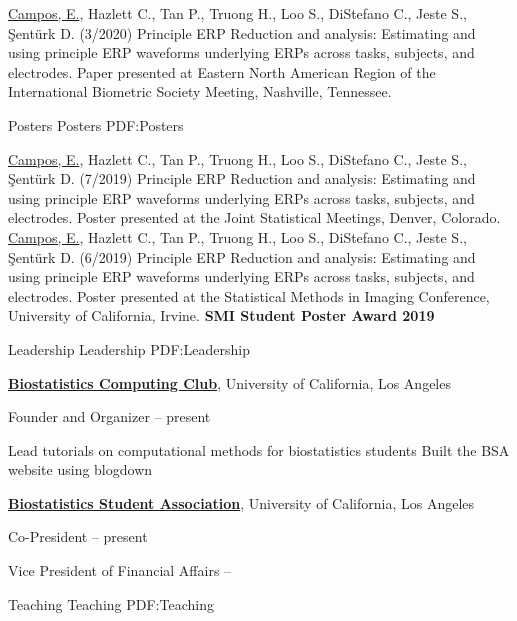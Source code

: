 \documentclass[letterpaper,MMMyyyy,nonstopmode]{simpleresumecv}
\begin{document}
\begin{Body}
\BigGap
\BulletItem
\underline{Campos, E.}, Hazlett C., Tan P., Truong H., Loo S., DiStefano C., Jeste S., \c{S}ent\"{u}rk D. (3/2020) Principle ERP Reduction and analysis: Estimating and using principle ERP waveforms underlying ERPs across tasks, subjects, and electrodes. Paper presented at Eastern North American Region of the International Biometric Society Meeting, Nashville, Tennessee.


\BigGap
\SubSection
{Posters}
{Posters}
{PDF:Posters}

\BigGap 
\BulletItem 
\underline{Campos, E.}, Hazlett C., Tan P., Truong H., Loo S., DiStefano C., Jeste S., \c{S}ent\"{u}rk D. (7/2019) Principle ERP Reduction and analysis: Estimating and using principle ERP waveforms underlying ERPs across tasks, subjects, and electrodes. Poster presented at the Joint Statistical Meetings, Denver, Colorado.
\BigGap
\BulletItem 
\underline{Campos, E.}, Hazlett C., Tan P., Truong H., Loo S., DiStefano C., Jeste S., \c{S}ent\"{u}rk D. (6/2019) Principle ERP Reduction and analysis: Estimating and using principle ERP waveforms underlying ERPs across tasks, subjects, and electrodes. Poster presented at the Statistical Methods in Imaging Conference, University of California, Irvine. \textbf{SMI Student Poster Award 2019}



\Section
{Leadership}
{Leadership}
{PDF:Leadership}

\Entry
\href{http://ucla-bsa.netlify.com}
{\textbf{Biostatistics Computing Club}},
University of California, Los Angeles

Founder and Organizer
\hfill
{} -- present
\begin{Detail}
\SubBulletItem
Lead tutorials on computational methods for biostatistics students
\SubBulletItem
Built the BSA website using blogdown
\end{Detail}
\BigGap
\Entry
\href{https://ucla-bsa.github.io}
{\textbf{Biostatistics Student Association}},
University of California, Los Angeles

Co-President 
\hfill
{} -- present

Vice President of Financial Affairs
\hfill
{} -- 



\Section
{Teaching}
{Teaching}
{PDF:Teaching}


\end{Body}
\end{document}
